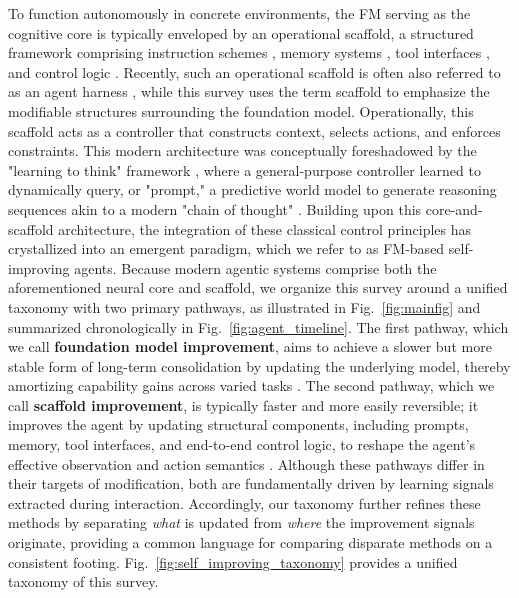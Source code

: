  To function autonomously in concrete environments, the FM serving as the cognitive core is typically enveloped by an operational {scaffold}, a structured framework comprising instruction schemes \citep{yuksekgonul2024textgradautomaticdifferentiationtext, guo2025evopromptconnectingllmsevolutionary}, memory systems \citep{chhikara2025mem0buildingproductionreadyai, zhang2026memrlselfevolvingagentsruntime}, tool interfaces \citep{qiu2025alitageneralistagentenabling, wölflein2025llmagentsmakingagent}, and control logic \citep{hong2023metagpt,10.5555/3692070.3694667,xiong2025beyond}. Recently, such an operational scaffold is often also referred to as an agent {harness} \citep{rajasekaran2026harnessdesign, trivedy2026agentharness, zhang2026selfharnessharnessesimprove, zhong2026aiharnessengineeringruntime}, while this survey uses the term scaffold to emphasize the modifiable structures surrounding the foundation model. Operationally, this scaffold acts as a controller that constructs context, selects actions, and enforces constraints. This modern architecture was conceptually foreshadowed by the "learning to think" framework \citep{schmidhuber2015learning}, where a general-purpose controller learned to dynamically query, or "prompt," a predictive world model to generate reasoning sequences akin to a modern "chain of thought" \citep{wei2022chain}.
Building upon this core-and-scaffold architecture, the integration of these classical control principles has crystallized into an emergent paradigm, which we refer to as FM-based self-improving agents. Because modern agentic systems comprise both the aforementioned neural core and scaffold, we organize this survey around a unified taxonomy with two primary pathways, as illustrated in Fig.~\ref{fig:mainfig} and summarized chronologically in Fig.~\ref{fig:agent_timeline}. The first pathway, which we call \textbf{foundation model improvement}, aims to achieve a slower but more stable form of long-term consolidation by updating the underlying model, thereby amortizing capability gains across varied tasks \citep{huang2023large, zhao2024selfguidebettertaskspecificinstruction, wang2025improvingmodelalignmentcollective, xiao2025uigenie, bougie2026alignuserhumanalignedllmagents}. The second pathway, which we call \textbf{scaffold improvement}, is typically faster and more easily reversible; it improves the agent by updating structural components, including prompts, memory, tool interfaces, and end-to-end control logic, to reshape the agent’s effective observation and action semantics \citep{fernando2024promptbreeder, chhikara2025mem0buildingproductionreadyai, wölflein2025llmagentsmakingagent, zhang2025darwingodelmachineopenended, borthwick2026robophdselfimprovingtexttosqlautonomous}. Although these pathways differ in their targets of modification, both are fundamentally driven by learning signals extracted during interaction. Accordingly, our taxonomy further refines these methods by separating \textit{what} is updated from \textit{where} the improvement signals originate, providing a common language for comparing disparate methods on a consistent footing. Fig.~\ref{fig:self_improving_taxonomy} provides a unified taxonomy of this survey.


